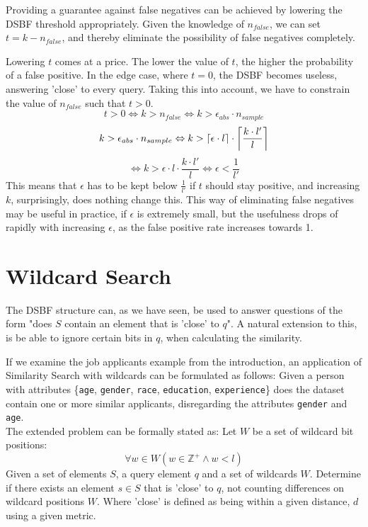 \documentclass[a4paper,11pt]{article}
\DeclarePairedDelimiter{\ceil}{\lceil}{\rceil}
\begin{document}
Providing a guarantee against false negatives can be achieved by lowering the DSBF threshold appropriately. Given the knowledge of $n_{false}$, we can set $t = k - n_{false}$, and thereby eliminate the possibility of false negatives completely.

Lowering $t$ comes at a price. The lower the value of $t$, the higher the probability of a false positive. In the edge case, where $t=0$, the DSBF becomes useless, answering 'close' to every query. Taking this into account, we have to constrain the value of $n_{false}$ such that $t>0$.
\[t > 0 \Leftrightarrow k > n_{false} \Leftrightarrow k > \epsilon_{abs} \cdot n_{sample}\]
\[k > \epsilon_{abs} \cdot n_{sample} \Leftrightarrow k > \ceil{\epsilon \cdot l} \cdot \ceil[\bigg]{\frac{k \cdot l{'}}{l}}\]
\[\Leftrightarrow k > \epsilon \cdot l \cdot \frac{k \cdot l{'}}{l} \Leftrightarrow \epsilon < \frac{1}{l'}\]
This means that $\epsilon$ has to be kept below $\frac{1}{l'}$ if $t$ should stay positive, and increasing $k$, surprisingly, does nothing change this. This way of eliminating false negatives may be useful in practice, if $\epsilon$ is extremely small, but the usefulness drops of rapidly with increasing $\epsilon$, as the false positive rate increases towards 1.

\section{Wildcard Search}
The DSBF structure can, as we have seen, be used to answer questions of the form "does $S$ contain an element that is 'close' to $q$". A natural extension to this, is be able to ignore certain bits in $q$, when calculating the similarity.

If we examine the job applicants example from the introduction, an application of Similarity Search with wildcards can be formulated as follows: Given a person with attributes \{\texttt{age}, \texttt{gender}, \texttt{race}, \texttt{education}, \texttt{experience}\} does the dataset contain one or more similar applicants, disregarding the attributes \texttt{gender} and \texttt{age}.\\

The extended problem can be formally stated as: Let $W$ be a set of wildcard bit positions:
\[\forall w \in W (w \in \mathbb{Z}^+ \land w < l)\]
Given a set of elements $S$, a query element $q$ and a set of wildcards $W$. Determine if there exists an element $s \in S$ that is 'close' to $q$, not counting differences on wildcard positions $W$. Where 'close' is defined as being within a given distance, $d$ using a given metric.
\end{document}
